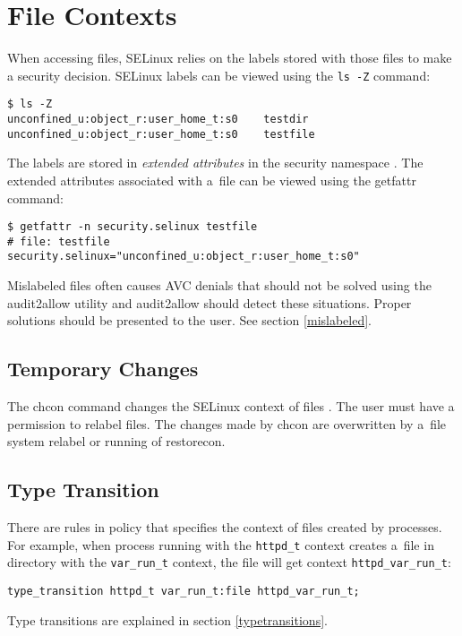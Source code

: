 \section{File Contexts}
\label{filecontexts}
When accessing files, SELinux relies on the labels stored with those files to
make a security decision. SELinux labels can be viewed using the \texttt{ls -Z}
command:
\begin{lstlisting}
$ ls -Z
unconfined_u:object_r:user_home_t:s0    testdir
unconfined_u:object_r:user_home_t:s0    testfile
\end{lstlisting}
The labels are stored in \emph{extended attributes} in the security namespace
\cite{xattrman}. The extended attributes associated with a~file can be viewed
using the getfattr command:
\begin{lstlisting}
$ getfattr -n security.selinux testfile
# file: testfile
security.selinux="unconfined_u:object_r:user_home_t:s0"
\end{lstlisting}
Mislabeled files often causes AVC denials that should not be solved using the
audit2allow utility and audit2allow should detect these situations. Proper
solutions should be presented to the user. See section \ref{mislabeled}.

\subsection{Temporary Changes}
The chcon command changes the SELinux context of files \cite{selinuxguide}. The
user must have a permission to relabel files. The changes made by chcon are
overwritten by a~file system relabel or running of restorecon.

\subsection{Type Transition}
There are rules in policy that specifies the context of files created by
processes. For example, when process running with the \texttt{httpd\_t} context
creates a~file in directory with the \texttt{var\_run\_t} context, the file will
get context \texttt{httpd\_var\_run\_t}:
\begin{lstlisting}[language=te]
type_transition httpd_t var_run_t:file httpd_var_run_t;
\end{lstlisting}
Type transitions are explained in section \ref{typetransitions}.

